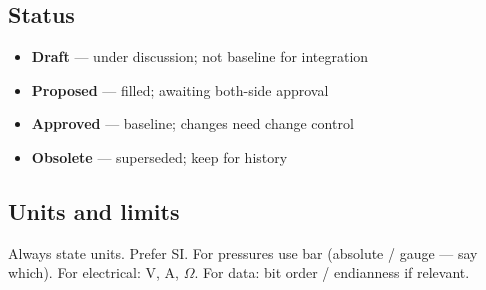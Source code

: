\subsection{Status}

\begin{itemize}
  \item \textbf{Draft} --- under discussion; not baseline for integration
  \item \textbf{Proposed} --- filled; awaiting both-side approval
  \item \textbf{Approved} --- baseline; changes need change control
  \item \textbf{Obsolete} --- superseded; keep for history
\end{itemize}

\subsection{Units and limits}

Always state units. Prefer SI. For pressures use bar (absolute / gauge --- say
which). For electrical: V, A, $\Omega$. For data: bit order / endianness if
relevant.
